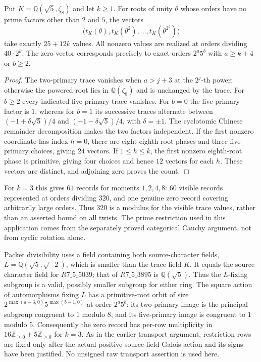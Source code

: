 \begin{proposition}
\label{prop:m5-power-phase-inventory}
Put $K=\mathbb Q(\sqrt5,\zeta_8)$ and let $k\geq1$.
For roots of unity $\theta$ whose orders have no prime factors other than
$2$ and $5$, the vectors
\[
 \bigl(t_K(\theta),t_K(\theta^2),\ldots,
             t_K(\theta^{2^k})\bigr)
\]
take exactly $25+12k$ values. All nonzero values are realized at orders
dividing $40\cdot2^k$. The zero vector corresponds precisely to exact
orders $2^a5^b$ with $a\geq k+4$ or $b\geq2$.
\end{proposition}
\begin{proof}
The two-primary trace vanishes when $a>j+3$ at the $2^j$-th power;
otherwise the powered root lies in $\mathbb Q(\zeta_8)$ and is unchanged
by the trace. For $b\geq2$ every indicated five-primary trace vanishes.
For $b=0$ the five-primary factor is $1$, whereas for $b=1$ its successive
traces alternate between
$(-1+\delta\sqrt5)/4$ and $(-1-\delta\sqrt5)/4$, with $\delta=\pm1$.
The cyclotomic Chinese remainder decomposition makes the two factors
independent. If the first nonzero coordinate has index $h=0$, there are
eight eighth-root phases and three five-primary choices, giving $24$
vectors. If $1\leq h\leq k$, the first nonzero eighth-root phase is
primitive, giving four choices and hence $12$ vectors for each $h$.
These vectors are distinct, and adjoining zero proves the count.
\end{proof}

For $k=3$ this gives $61$ records for moments $1,2,4,8$: $60$ visible
records represented at orders dividing $320$, and one genuine zero record
covering arbitrarily large orders. Thus $320$ is a modulus for the visible
trace values, rather than an asserted bound on all twists.
The prime restriction used in this application comes from the separately
proved categorical Cauchy argument, not from cyclic rotation alone.

Packet divisibility uses a field containing both source-character fields,
$L=\mathbb Q(\sqrt5,\sqrt{-2})$, which is smaller than the trace field $K$.
It equals the source-character field for $R7\_5\_5039$; that of
$R7\_5\_3895$ is $\mathbb Q(\sqrt5)$. Thus the $L$-fixing subgroup
is a valid, possibly smaller subgroup for either ring.
The square action of automorphisms fixing $L$ has a primitive-root orbit
of size $2^{\max(a-3,0)}5^{\max(b-1,0)}$ at order $2^a5^b$:
its two-primary image is the principal subgroup congruent to $1$ modulo
$8$, and its five-primary image is congruent to $1$ modulo $5$.
Consequently the zero record has per-row multiplicity in
$16\mathbb Z_{\geq0}+5\mathbb Z_{\geq0}$ for $k=3$.
As in the earlier transport argument, restriction rows are fixed only
after the actual positive source-field Galois action and its signs have
been justified. No unsigned raw transport assertion is used here.
